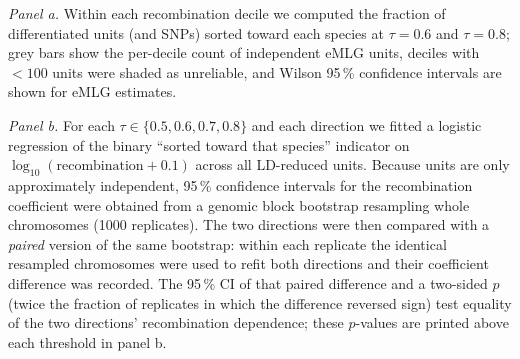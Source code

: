 \documentclass[11pt]{article}
\begin{document}
{\emph{Panel a.} Within each recombination decile we computed the fraction of differentiated
units (and SNPs) sorted toward each species at $\tau=0.6$ and $\tau=0.8$; grey bars show the
per-decile count of independent eMLG units, deciles with $<100$ units were shaded as
unreliable, and Wilson 95\,\% confidence intervals are shown for eMLG estimates.

\emph{Panel b.} For each $\tau\in\{0.5,0.6,0.7,0.8\}$ and each direction we fitted a logistic
regression of the binary ``sorted toward that species'' indicator on
$\log_{10}(\text{recombination}+0.1)$ across all LD-reduced units. Because units are only
approximately independent, 95\,\% confidence intervals for the recombination coefficient
were obtained from a genomic block bootstrap resampling whole chromosomes (1000 replicates).
The two directions were then compared with a \emph{paired} version of the same bootstrap:
within each replicate the identical resampled chromosomes were used to refit both directions
and their coefficient difference was recorded. The 95\,\% CI of that paired difference and a
two-sided $p$ (twice the fraction of replicates in which the difference reversed sign) test
equality of the two directions' recombination dependence; these $p$-values are printed above
each threshold in panel b.}
\end{document}
